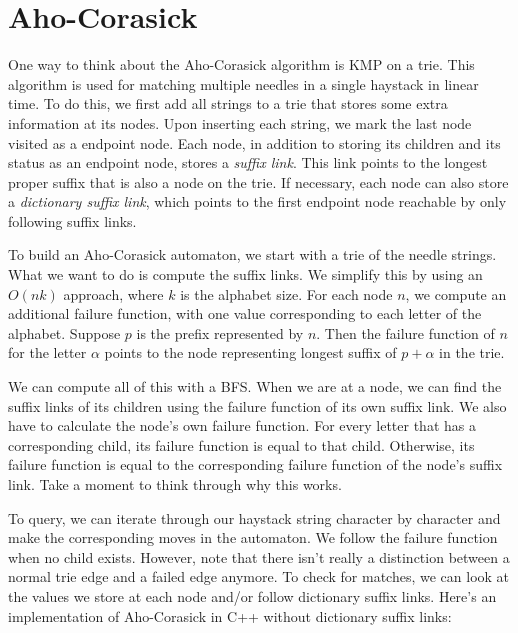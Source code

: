 \section{Aho-Corasick}

One way to think about the Aho-Corasick algorithm is KMP on a trie. This algorithm is used for matching multiple needles in a single haystack in linear time. To do this, we first add all strings to a trie that stores some extra information at its nodes. Upon inserting each string, we mark the last node visited as a endpoint node. Each node, in addition to storing its children and its status as an endpoint node, stores a \emph{suffix link}. This link points to the longest proper suffix that is also a node on the trie. If necessary, each node can also store a \emph{dictionary suffix link}, which points to the first endpoint node reachable by only following suffix links.

To build an Aho-Corasick automaton, we start with a trie of the needle strings. What we want to do is compute the suffix links. We simplify this by using an $O(nk)$ approach, where $k$ is the alphabet size. For each node $n$, we compute an additional failure function, with one value corresponding to each letter of the alphabet. Suppose $p$ is the prefix represented by $n$. Then the failure function of $n$ for the letter $\alpha$ points to the node representing longest suffix of $p + \alpha$ in the trie.

We can compute all of this with a BFS. When we are at a node, we can find the suffix links of its children using the failure function of its own suffix link. We also have to calculate the node's own failure function. For every letter that has a corresponding child, its failure function is equal to that child. Otherwise, its failure function is equal to the corresponding failure function of the node's suffix link. Take a moment to think through why this works.

To query, we can iterate through our haystack string character by character and make the corresponding moves in the automaton. We follow the failure function when no child exists. However, note that there isn't really a distinction between a normal trie edge and a failed edge anymore. To check for matches, we can look at the values we store at each node and/or follow dictionary suffix links. Here's an implementation of Aho-Corasick in C++ without dictionary suffix links:

